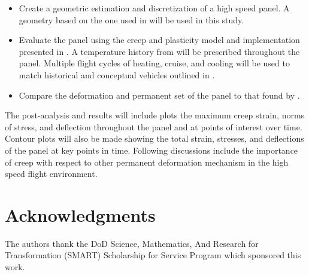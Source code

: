 \documentclass[conf]{new-aiaa}
\begin{document}
\begin{itemize}
  \item Create a geometric estimation and discretization of a high speed panel.
        A geometry based on the one used in 
        \cite{ culler_impact_of_FTS_coupling_on_response_prediction_hypersonic_skin_panels}
        will be used in this study.
  \item Evaluate the panel using the creep and plasticity model and implementation presented in
        \cite{ li_simulation_of_finite_strain_inelastic_phenomena_governed_by_creep_and_plasticity}.
        A temperature history from 
        \cite{ culler_impact_of_FTS_coupling_on_response_prediction_hypersonic_skin_panels}
        will be prescribed throughout the panel. 
        Multiple flight cycles of heating, cruise, and cooling will be used
        to match historical and conceptual vehicles outlined in
        \cite{ kordes_structureal_heating_experiencs_on_the_x15_airplane,
               zuchowski_AVIATR_Predictive_capability_for_hypersonic_structural_response_and_life_prediction_phase_II}.
  \item Compare the deformation and permanent set of the panel to that 
        found by \cite{ culler_impact_of_FTS_coupling_on_response_prediction_hypersonic_skin_panels}.
\end{itemize}

\noindent
The post-analysis and results will include plots the maximum creep strain, norms of stress, 
and deflection throughout the panel and at points of interest over time. 
Contour plots will also be made showing the total strain, stresses, and deflections
of the panel at key points in time.
Following discussions include the importance of creep 
with respect to other permanent deformation mechanism 
in the high speed flight environment.

\section*{Acknowledgments}
The authors thank the DoD Science, Mathematics, And 
Research for Transformation (SMART) Scholarship
for Service Program which sponsored this work.


\end{document}
